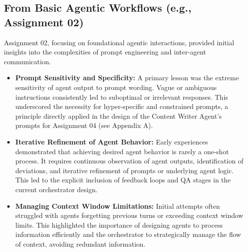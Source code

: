 \documentclass{custom-academic-template}
\begin{document}
\subsection{From Basic Agentic Workflows (e.g., Assignment 02)}
Assignment 02, focusing on foundational agentic interactions, provided initial insights into the complexities of prompt engineering and inter-agent communication.
\begin{itemize}
    \item \textbf{Prompt Sensitivity and Specificity:} A primary lesson was the extreme sensitivity of agent output to prompt wording. Vague or ambiguous instructions consistently led to suboptimal or irrelevant responses. This underscored the necessity for hyper-specific and constrained prompts, a principle directly applied in the design of the Content Writer Agent's prompts for Assignment 04 (see Appendix A).
    \item \textbf{Iterative Refinement of Agent Behavior:} Early experiences demonstrated that achieving desired agent behavior is rarely a one-shot process. It requires continuous observation of agent outputs, identification of deviations, and iterative refinement of prompts or underlying agent logic. This led to the explicit inclusion of feedback loops and QA stages in the current orchestrator design.
    \item \textbf{Managing Context Window Limitations:} Initial attempts often struggled with agents forgetting previous turns or exceeding context window limits. This highlighted the importance of designing agents to process information efficiently and the orchestrator to strategically manage the flow of context, avoiding redundant information.
\end{itemize}
\end{document}
